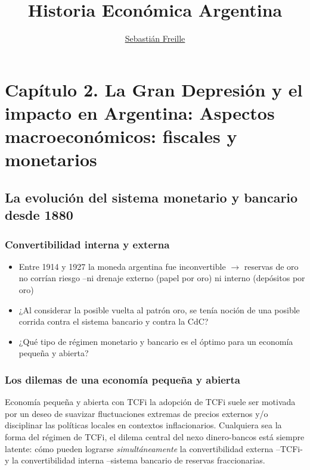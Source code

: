 \documentclass[14pt,aspectratio=169]{beamer}
\title{Historia Económica Argentina}
\author{\underline{Sebastián Freille} \inst{1}}
\institute[shortinst]{\inst{1} IEF-UNC \\ UCC}
\date{}
\begin{document}
{
  \begin{frame}
    \titlepage
  \end{frame}
}

  
  \section{Capítulo 2. La Gran Depresión y el impacto en Argentina:
    Aspectos macroeconómicos: fiscales y monetarios}


  \subsection{La evolución del sistema monetario y bancario desde 1880}


 \begin{frame}\frametitle{Convertibilidad interna y externa}
    \begin{itemize}\itemsep 10pt
      \item Entre 1914 y 1927 la moneda argentina fue inconvertible
        $\longrightarrow$ reservas de oro no corrían riesgo --ni
        drenaje externo (papel por oro) ni interno (depósitos por oro)
        \item ¿Al considerar la posible vuelta al patrón oro, se tenía
          noción de una posible corrida contra el sistema bancario y
          contra la CdC?
          \item ¿Qué tipo de régimen monetario y bancario es el
            óptimo para un economía pequeña y abierta?
                 \end{itemize}
      \end{frame}
  
      

 \begin{frame}\frametitle{Los dilemas de una economía pequeña y abierta}
   \begin{block}{Economía pequeña y abierta con TCFi}
     la adopción de TCFi suele ser motivada por un deseo de suavizar
     fluctuaciones extremas de precios externos y/o disciplinar las
     políticas locales en contextos inflacionarios. Cualquiera sea la
     forma del régimen de TCFi, el dilema central del nexo
     dinero-bancos está siempre latente: cómo pueden lograrse
     \textit{simultáneamente} la convertibilidad externa --TCFi- y la
     convertibilidad interna --sistema bancario de reservas
     fraccionarias. 
     \end{block}
      \end{frame}
  
\end{document}
